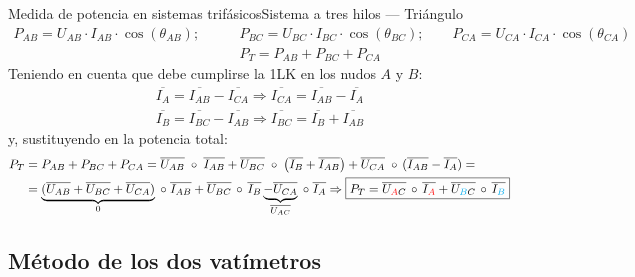 \documentclass[aspectratio=169, xcolor={usenames,svgnames,dvipsnames}]{beamer}
\begin{document}
\begin{frame}{Medida de potencia en sistemas trifásicos}{Sistema a tres hilos --- Triángulo}
	\begin{align*}
	    P_{AB}=U_{AB}\cdot I_{AB} \cdot \cos(\theta_{AB});\qquad 
	    &P_{BC}=U_{BC}\cdot I_{BC} \cdot \cos(\theta_{BC});\qquad 
	    P_{CA}=U_{CA}\cdot I_{CA} \cdot \cos(\theta_{CA})\\
	    &P_T=P_{AB}+P_{BC}+P_{CA}
	\end{align*}
	Teniendo en cuenta que debe cumplirse la 1LK en los nudos $A$ y $B$:
	\begin{align*}
	    \overline{I_A}=\overline{I_{AB}}-\overline{I_{CA}}\Rightarrow \overline{I_{CA}}=\overline{I_{AB}}-\overline{I_A}\\
	    \overline{I_B}=\overline{I_{BC}}-\overline{I_{AB}}\Rightarrow \overline{I_{BC}}=\overline{I_{B}}+\overline{I_{AB}}
	\end{align*}
	y, sustituyendo en la potencia total:
		\begin{align*}
	    P_T&=P_{AB}+P_{BC}+P_{CA}=\overline{U_{AB}}\;\circ\; \overline{I_{AB}} + \overline{U_{BC}}\;\circ\;\left(\overline{I_B}+\overline{I_{AB}} \right)  + \overline{U_{CA}}\;\circ\,(\overline{I_{AB}}-\overline{I_A})=\nonumber \\
	    & =\underbrace{(\overline{U_{AB}}+\overline{U_{BC}}+\overline{U_{CA}})}_{0}\;\circ\; \overline{I_{AB}}+\overline{U_{BC}}\,\circ\,\overline{I_B}\underbrace{-\overline{U_{CA}}}_{\overline{U_{AC}}}\;\circ\; \overline{I_A}\Rightarrow \boxed{P_T=\overline{U_{\textcolor{red}{A}C}}\,\circ\,\overline{I_{\textcolor{red}{A}}}+\overline{U_{\textcolor{cyan}{B}C}}\,\circ\,\overline{I_{\textcolor{cyan}{B}}}}
	\end{align*}
\end{frame}

\subsection{Método de los dos vatímetros}
\end{document}
